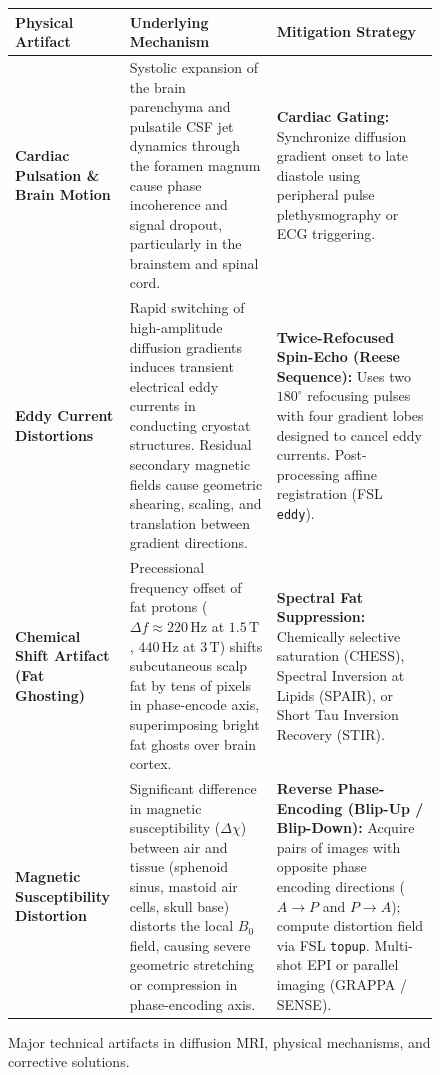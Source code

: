 \documentclass[11pt,a4paper]{article}
\begin{document}
\begin{figure}[htbp]
\centering
\setlength{\tabcolsep}{4pt}
\begin{tabular}{p{3.8cm}p{5.5cm}p{5.5cm}}
\toprule
\textbf{Physical Artifact} & \textbf{Underlying Mechanism} & \textbf{Mitigation Strategy} \\
\midrule
\textbf{Cardiac Pulsation \& Brain Motion} & Systolic expansion of the brain parenchyma and pulsatile CSF jet dynamics through the foramen magnum cause phase incoherence and signal dropout, particularly in the brainstem and spinal cord. & \textbf{Cardiac Gating:} Synchronize diffusion gradient onset to late diastole using peripheral pulse plethysmography or ECG triggering. \\
\addlinespace
\textbf{Eddy Current Distortions} & Rapid switching of high-amplitude diffusion gradients induces transient electrical eddy currents in conducting cryostat structures. Residual secondary magnetic fields cause geometric shearing, scaling, and translation between gradient directions. & \textbf{Twice-Refocused Spin-Echo (Reese Sequence):} Uses two $180^\circ$ refocusing pulses with four gradient lobes designed to cancel eddy currents. Post-processing affine registration (FSL \texttt{eddy}). \\
\addlinespace
\textbf{Chemical Shift Artifact (Fat Ghosting)} & Precessional frequency offset of fat protons ($\Delta f \approx 220\,\text{Hz}$ at $1.5\,\text{T}$, $440\,\text{Hz}$ at $3\,\text{T}$) shifts subcutaneous scalp fat by tens of pixels in phase-encode axis, superimposing bright fat ghosts over brain cortex. & \textbf{Spectral Fat Suppression:} Chemically selective saturation (CHESS), Spectral Inversion at Lipids (SPAIR), or Short Tau Inversion Recovery (STIR). \\
\addlinespace
\textbf{Magnetic Susceptibility Distortion} & Significant difference in magnetic susceptibility ($\Delta \chi$) between air and tissue (sphenoid sinus, mastoid air cells, skull base) distorts the local $B_0$ field, causing severe geometric stretching or compression in phase-encoding axis. & \textbf{Reverse Phase-Encoding (Blip-Up / Blip-Down):} Acquire pairs of images with opposite phase encoding directions ($A \to P$ and $P \to A$); compute distortion field via FSL \texttt{topup}. Multi-shot EPI or parallel imaging (GRAPPA / SENSE). \\
\bottomrule
\end{tabular}
\caption{Major technical artifacts in diffusion MRI, physical mechanisms, and corrective solutions.}
\label{tab:dmri_artifacts}
\end{figure}
\end{document}
